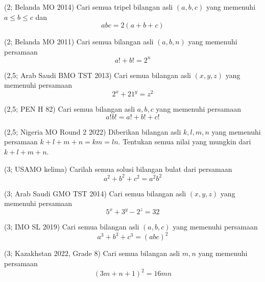 \documentclass[11pt]{scrartcl}
\begin{document}
\begin{problem}
    (2; Belanda MO 2014) Cari semua tripel bilangan asli $(a, b, c)$ yang memenuhi $a \leq b \leq c$ dan \[abc = 2(a + b + c)\]
\end{problem}

\begin{problem}
    (2; Belanda MO 2011) Cari semua bilangan asli $(a, b, n)$ yang memenuhi persamaan \[a! + b! = 2^n\]
\end{problem}

\begin{problem}
    (2,5; Arab Saudi BMO TST 2013) Cari semua bilangan asli $(x, y, z)$ yang memenuhi persamaan \[2^x + 21^y = z^2\]
\end{problem}

\begin{problem}
    (2,5; PEN H 82) Cari semua bilangan asli $a, b, c$ yang memenuhi persamaan \[a!b! = a! + b! + c!\]
\end{problem}    

\begin{problem}
    (2,5; Nigeria MO Round 2 2022) Diberikan bilangan asli $k, l, m, n$ yang memenuhi persamaan $k + l + m + n = km = ln$. Tentukan semua nilai yang mungkin dari $k + l + m + n$.
\end{problem}

\begin{problem}
    (3; USAMO kelima) Carilah semua solusi bilangan bulat dari persamaan \[a^2 + b^2 + c^2 = a^2b^2\] 
\end{problem}

\begin{problem}
    (3; Arab Saudi GMO TST 2014) Cari semua bilangan asli $(x, y, z)$ yang memenuhi persamaan \[5^x + 3^y - 2^z = 32\]
\end{problem}

\begin{problem}
    (3; IMO SL 2019) Cari semua bilangan asli $(a, b, c)$ yang memenuhi persamaan \[a^3 + b^3 + c^3 = (abc)^2 \]
\end{problem}
    
\begin{problem}
    (3; Kazakhstan 2022, Grade 8) Cari semua bilangan asli $m, n$ yang memenuhi persamaan \[(3m + n + 1)^2 = 16mn\]     
\end{problem}
    
\end{document}

